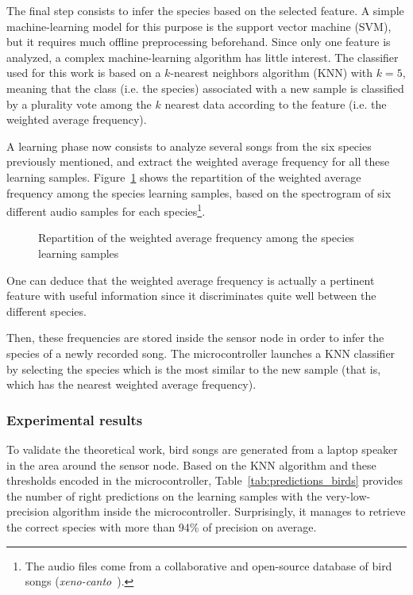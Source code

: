 \documentclass{EPL-master-thesis-covers-EN}
\begin{document}
The final step consists to infer the species based on the selected feature. A simple machine-learning model for this purpose is the support vector machine (SVM), but it requires much offline preprocessing beforehand. Since only one feature is analyzed, a complex machine-learning algorithm has little interest. The classifier used for this work is based on a $k$-nearest neighbors algorithm (KNN) with $k=5$, meaning that the class (i.e. the species) associated with a new sample is classified by a plurality vote among the $k$ nearest data according to the feature (i.e. the weighted average frequency).

A learning phase now consists to analyze several songs from the six species previously mentioned, and extract the weighted average frequency for all these learning samples. Figure~\ref{fig:weighted_average_frequency} shows the repartition of the weighted average frequency among the species learning samples, based on the spectrogram of six different audio samples for each species\footnote{The audio files come from a collaborative and open-source database of bird songs (\textit{xeno-canto}~\cite{xeno}).}.

\begin{figure}[H]
    \centering
    
    \caption{Repartition of the weighted average frequency among the species learning samples}
    \label{fig:weighted_average_frequency}
\end{figure}

One can deduce that the weighted average frequency is actually a pertinent feature with useful information since it discriminates quite well between the different species.

Then, these frequencies are stored inside the sensor node in order to infer the species of a newly recorded song. The microcontroller launches a KNN classifier by selecting the species which is the most similar to the new sample (that is, which has the nearest weighted average frequency).

\subsubsection*{Experimental results}

To validate the theoretical work, bird songs are generated from a laptop speaker in the area around the sensor node.
Based on the KNN algorithm and these thresholds encoded in the microcontroller, Table~\ref{tab:predictions_birds} provides the number of right predictions on the learning samples with the very-low-precision algorithm inside the microcontroller. Surprisingly, it manages to retrieve the correct species with more than 94\% of precision on average.
\end{document}
